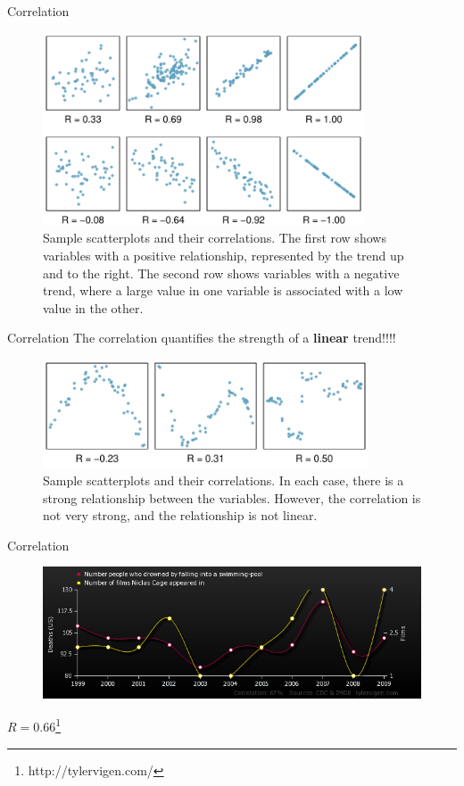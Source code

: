 \documentclass[12pt,a4paper]{beamer}
\begin{document}
\begin{frame}{Correlation}
	\begin{figure}
	   \centering
	   \includegraphics[width=0.85\textwidth]{figures/posNegCorPlots/posNegCorPlots}
	  \small \caption{Sample scatterplots and their correlations. The first row shows variables with a positive relationship, represented by the trend up and to the right. The second row shows variables with a negative trend, where a large value in one variable is associated with a low value in the other.}
	\end{figure}
\end{frame}
\begin{frame}{Correlation}
	The correlation quantifies the strength of a \textbf{linear} trend!!!! 
	\begin{figure}
	   \centering
	   \includegraphics[width=0.86\textwidth]{figures/posNegCorPlots/corForNonLinearPlots}
	   \small\caption{Sample scatterplots and their correlations. In each case, there is a strong relationship between the variables. However, the correlation is not very strong, and the relationship is not linear.}
	\end{figure}
\end{frame}
\begin{frame}{Correlation}
\begin{figure}
	\centering
	\includegraphics[width=\textwidth]{figures/Correlation}
	\end{figure}
	$R=0.66$\footnote{http://tylervigen.com/}
\end{frame}
\end{document}
